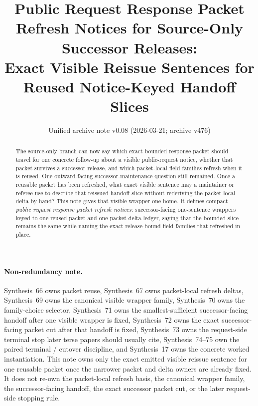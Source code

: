 \documentclass[11pt]{article}
\title{Public Request Response Packet Refresh Notices for Source-Only Successor Releases:\\[0.5ex]
\large Exact Visible Reissue Sentences for Reused Notice-Keyed Handoff Slices}
\author{}
\date{Unified archive note v0.08 (2026-03-21; archive v476)}
\begin{document}
\maketitle

\begin{abstract}
The source-only branch can now say which exact bounded response packet should travel for one concrete follow-up about a visible public-request notice, whether that packet survives a successor release, and which packet-local field families refresh when it is reused. One outward-facing successor-maintenance question still remained. Once a reusable packet has been refreshed, what exact visible sentence may a maintainer or referee use to describe that reissued handoff slice without rederiving the packet-local delta by hand? This note gives that visible wrapper one home. It defines compact \emph{public request response packet refresh notices}: successor-facing one-sentence wrappers keyed to one reused packet and one packet-delta ledger, saying that the bounded slice remains the same while naming the exact release-bound field families that refreshed in place.
\end{abstract}

\paragraph{Non-redundancy note.}
Synthesis~66 owns packet reuse, Synthesis~67 owns packet-local refresh deltas, Synthesis~69 owns the canonical visible wrapper family, Synthesis~70 owns the family-choice selector, Synthesis~71 owns the smallest-sufficient successor-facing handoff after one visible wrapper is fixed, Synthesis~72 owns the exact successor-facing packet cut after that handoff is fixed, Synthesis~73 owns the request-side terminal stop later terse papers should usually cite, Synthesis~74--75 own the paired terminal / cutover discipline, and Synthesis~17 owns the concrete worked instantiation.\cite{series:publicrequestresponsepacketcarryforward,series:publicrequestresponsepacketdeltas,series:publicrequestresponsepacketrefreshnoticenormalforms,series:publicrequestresponsepacketrefreshnoticeselections,series:publicrequestresponsepacketrefreshresponsemenus,series:publicrequestresponsepacketrefreshresponsepackets,series:publicrequestresponsepacketrefreshresponsepacketclosureverdicts,series:pairedterminalcitationdiscipline,series:pairedterminalcutoverrule,series:workedexample}
This note owns only the exact emitted visible reissue sentence for one reusable packet once the narrower packet and delta owners are already fixed. It does not re-own the packet-local refresh basis, the canonical wrapper family, the successor-facing handoff, the exact successor packet cut, or the later request-side stopping rule.
\end{document}
